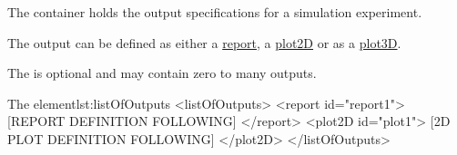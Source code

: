 \label{sec:listOfOutputs}

The  container holds the output specifications for a simulation experiment. 
%
%

The output can be defined as either a \hyperref[class:report]{report}, a \hyperref[class:2dPlot]{plot2D} or  as a \hyperref[class:plot3D]{plot3D}. 

\newpage
{}
The  is optional and may contain zero to many outputs. 
%
\begin{myXmlLst}{The  element}{lst:listOfOutputs}
<listOfOutputs>
 <report id="report1">
  [REPORT DEFINITION FOLLOWING]
 </report>
 <plot2D id="plot1">
  [2D PLOT DEFINITION FOLLOWING] 
 </plot2D>
</listOfOutputs>
\end{myXmlLst}
%

